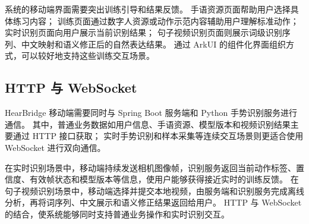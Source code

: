 系统的移动端界面需要突出训练引导和结果反馈。
手语资源页面帮助用户选择具体练习内容；
训练页面通过数字人资源或动作示范内容辅助用户理解标准动作；
实时识别页面向用户展示当前识别结果；
句子视频识别页面则展示词级识别序列、中文映射和语义修正后的自然表达结果。
通过 ArkUI 的组件化界面组织方式，可以较好地支持这些训练交互场景。

\subsection{HTTP 与 WebSocket}

HearBridge 移动端需要同时与 Spring Boot 服务端和 Python 手势识别服务进行通信。
其中，普通业务数据如用户信息、手语资源、模型版本和视频识别结果主要通过 HTTP 接口获取；
实时手势识别和样本采集等连续交互场景则更适合使用 WebSocket 进行双向通信。

在实时识别场景中，移动端持续发送相机图像帧，识别服务返回当前动作标签、置信度、有效帧状态和模型版本等信息，使用户能够获得接近实时的训练反馈。
在句子视频识别场景中，移动端选择并提交本地视频，由服务端和识别服务完成离线分析，再将词序列、中文展示和语义修正结果返回给用户。
HTTP 与 WebSocket 的结合，使系统能够同时支持普通业务操作和实时识别交互。
